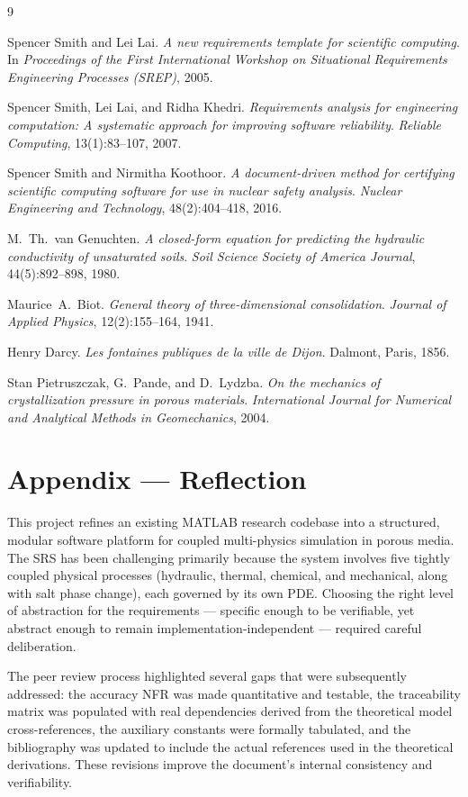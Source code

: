 \documentclass[12pt]{article}
\begin{document}
\begin{thebibliography}{9}

Spencer Smith and Lei Lai.
\textit{A new requirements template for scientific computing}.
In \textit{Proceedings of the First International Workshop on Situational Requirements Engineering Processes (SREP)}, 2005.

Spencer Smith, Lei Lai, and Ridha Khedri.
\textit{Requirements analysis for engineering computation: A systematic approach for improving software reliability}.
\textit{Reliable Computing}, 13(1):83--107, 2007.

Spencer Smith and Nirmitha Koothoor.
\textit{A document-driven method for certifying scientific computing software for use in nuclear safety analysis}.
\textit{Nuclear Engineering and Technology}, 48(2):404--418, 2016.

M.~Th.\ van Genuchten.
\textit{A closed-form equation for predicting the hydraulic conductivity of unsaturated soils}.
\textit{Soil Science Society of America Journal}, 44(5):892--898, 1980.

Maurice~A.\ Biot.
\textit{General theory of three-dimensional consolidation}.
\textit{Journal of Applied Physics}, 12(2):155--164, 1941.

Henry Darcy.
\textit{Les fontaines publiques de la ville de Dijon}.
Dalmont, Paris, 1856.

Stan Pietruszczak, G.~Pande, and D.~Lydzba.
\textit{On the mechanics of crystallization pressure in porous materials}.
\textit{International Journal for Numerical and Analytical Methods in Geomechanics}, 2004.

\end{thebibliography}

\newpage
\section*{Appendix --- Reflection}

This project refines an existing MATLAB research codebase into a structured, modular software platform for coupled multi-physics simulation in porous media. The SRS has been challenging primarily because the system involves five tightly coupled physical processes (hydraulic, thermal, chemical, and mechanical, along with salt phase change), each governed by its own PDE. Choosing the right level of abstraction for the requirements --- specific enough to be verifiable, yet abstract enough to remain implementation-independent --- required careful deliberation.

The peer review process highlighted several gaps that were subsequently addressed: the accuracy NFR was made quantitative and testable, the traceability matrix was populated with real dependencies derived from the theoretical model cross-references, the auxiliary constants were formally tabulated, and the bibliography was updated to include the actual references used in the theoretical derivations. These revisions improve the document's internal consistency and verifiability.
\end{document}
